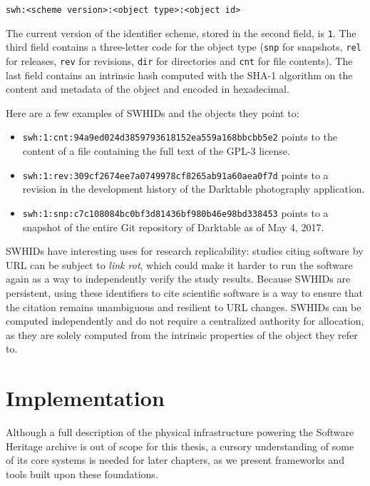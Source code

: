 \texttt{swh:<scheme version>:<object type>:<object id>}

The current version of the identifier scheme, stored in the second field, is
\texttt{1}. The third field contains a three-letter code for the object type
(\texttt{snp} for snapshots, \texttt{rel} for releases, \texttt{rev} for
revisions, \texttt{dir} for directories and \texttt{cnt} for file contents).
The last field contains an intrinsic hash computed with the SHA-1 algorithm on
the content and metadata of the object and encoded in hexadecimal.

Here are a few examples of \glspl{SWHID} and the objects they point to:

\begin{itemize}
    \setlength\itemsep{0em}
    \item \texttt{swh:1:cnt:94a9ed024d3859793618152ea559a168bbcbb5e2} points to
        the content of a file containing the full text of the GPL-3 license.
    \item \texttt{swh:1:rev:309cf2674ee7a0749978cf8265ab91a60aea0f7d} points to
        a revision in the development history of the Darktable photography
        application.
    \item \texttt{swh:1:snp:c7c108084bc0bf3d81436bf980b46e98bd338453} points to
        a snapshot of the entire Git repository of Darktable as of May 4, 2017.
\end{itemize}

\glspl{SWHID} have interesting uses for research replicability: studies
citing software by URL can be subject to \emph{link rot}, which could make it
harder to run the software again as a way to independently verify the study
results. Because \glspl{SWHID} are persistent, using these identifiers to cite
scientific software is a way to ensure that the citation remains unambiguous
and resilient to URL changes. \glspl{SWHID} can be computed independently and
do not require a centralized authority for allocation, as they are solely
computed from the intrinsic properties of the object they refer to.

\section{Implementation}%
\label{sec:swh-infrastructure}

Although a full description of the physical infrastructure powering the
Software Heritage archive is out of scope for this thesis, a cursory
understanding of some of its core systems is needed for later chapters, as we
present frameworks and tools built upon these foundations.

